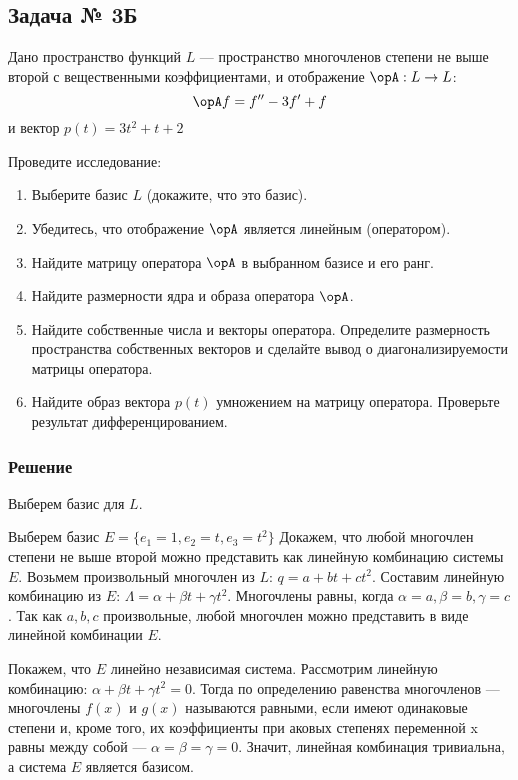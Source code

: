 \subsection{Задача № 3Б}

Дано пространство функций \(L\)
--- пространство многочленов степени не выше второй
с вещественными коэффициентами,
и отображение \(\opA : L \to L\):
\[
  \opA f = f'' - 3 f' + f
\]
и вектор \(p(t) = 3t^2 + t + 2\)

Проведите исследование:
\begin{enumerate}
  \item Выберите базис \(L\) (докажите, что это базис).
  \item Убедитесь, что отображение \(\opA\) является линейным (оператором).
  \item Найдите матрицу оператора \(\opA\) в выбранном базисе и его ранг.
  \item Найдите размерности ядра и образа оператора \(\opA\).
  \item Найдите собственные числа и векторы оператора.
    Определите размерность пространства собственных векторов
    и сделайте вывод о диагонализируемости матрицы оператора.
  \item Найдите образ вектора \(p(t)\) умножением на матрицу оператора.
    Проверьте результат дифференцированием.
\end{enumerate}

\subsubsection{Решение}

Выберем базис для \(L\).

Выберем базис \(E = \{e_1 = 1, e_2 = t, e_3 = t^2\}\)
Докажем, что любой многочлен степени не выше второй можно представить
как линейную комбинацию системы \(E\).
Возьмем произвольный многочлен из \(L\): \(q = a + bt + ct^2\).
Составим линейную комбинацию из \(E\):
\(\Lambda = \alpha + \beta t + \gamma t^2\).
Многочлены равны, когда \(\alpha = a, \beta = b, \gamma = c\).
Так как \(a, b, c\) произвольные,
любой многочлен можно представить в виде линейной комбинации \(E\).

Покажем, что \(E\) линейно независимая система.
Рассмотрим линейную комбинацию: $\alpha + \beta t + \gamma t^2 = 0$.
Тогда по определению равенства многочленов ---
многочлены \(f(x)\) и \(g(x)\) называются равными, если
имеют одинаковые степени и, кроме того, их коэффициенты при
аковых степенях переменной x равны между собой ---
\(\alpha = \beta = \gamma = 0\).
Значит, линейная комбинация тривиальна, а система \(E\) является базисом.

